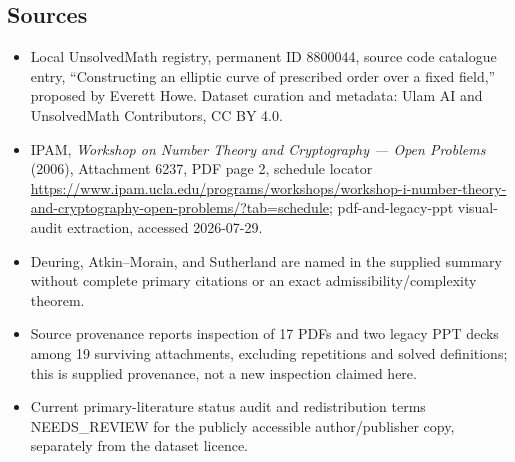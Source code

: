 \documentclass[11pt]{article}
\begin{document}
\subsection{Sources}
\begin{itemize}
\item Local UnsolvedMath registry, permanent ID 8800044, source code catalogue entry, ``Constructing an elliptic curve of prescribed order over a fixed field,'' proposed by Everett Howe. Dataset curation and metadata: Ulam AI and UnsolvedMath Contributors, CC BY 4.0.
\item IPAM, \emph{Workshop on Number Theory and Cryptography --- Open Problems} (2006), Attachment 6237, PDF page 2, schedule locator \url{https://www.ipam.ucla.edu/programs/workshops/workshop-i-number-theory-and-cryptography-open-problems/?tab=schedule}; pdf-and-legacy-ppt visual-audit extraction, accessed 2026-07-29.
\item Deuring, Atkin--Morain, and Sutherland are named in the supplied summary without complete primary citations or an exact admissibility/complexity theorem.
\item Source provenance reports inspection of 17 PDFs and two legacy PPT decks among 19 surviving attachments, excluding repetitions and solved definitions; this is supplied provenance, not a new inspection claimed here.
\item Current primary-literature status audit and redistribution terms NEEDS\_REVIEW for the publicly accessible author/publisher copy, separately from the dataset licence.
\end{itemize}
\end{document}
